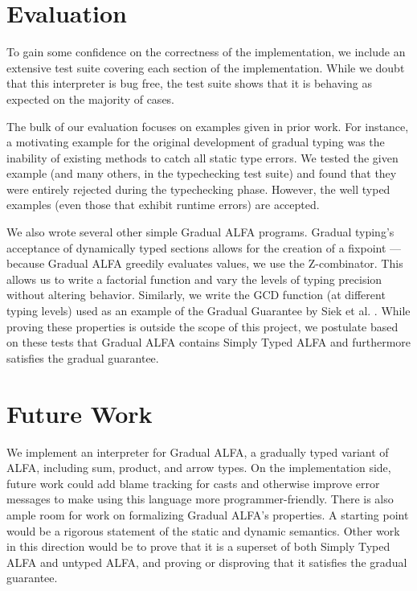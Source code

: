 \documentclass [11pt]{article}
\begin{document}

\section{Evaluation}
To gain some confidence on the correctness of the implementation, we include an extensive test suite covering each section of the implementation. While we doubt that this interpreter is bug free, the test suite shows that it is behaving as expected on the majority of cases.

The bulk of our evaluation focuses on examples given in prior work. For instance, a motivating example for the original development of gradual typing was the inability of existing methods to catch all static type errors. We tested the given example (and many others, in the typechecking test suite) and found that they were entirely rejected during the typechecking phase. However, the well typed examples (even those that exhibit runtime errors) are accepted.

We also wrote several other simple Gradual ALFA programs. Gradual typing's acceptance of dynamically typed sections allows for the creation of a fixpoint --- because Gradual ALFA greedily evaluates values, we use the Z-combinator. This allows us to write a factorial function and vary the levels of typing precision without altering behavior. Similarly, we write the GCD function (at different typing levels) used as an example of the Gradual Guarantee by Siek et al. \cite{siek2015refined}. While proving these properties is outside the scope of this project, we postulate based on these tests that Gradual ALFA contains Simply Typed ALFA and furthermore satisfies the gradual guarantee.

\section{Future Work}
We implement an interpreter for Gradual ALFA, a gradually typed variant of ALFA, including sum, product, and arrow types. On the implementation side,  future work could add blame tracking for casts and otherwise improve error messages to make using this language more programmer-friendly. There is also ample room for work on formalizing Gradual ALFA's properties. A starting point would be a rigorous statement of the static and dynamic semantics. Other work in this direction would be to prove that it is a superset of both Simply Typed ALFA and untyped ALFA, and proving or disproving that it satisfies the gradual guarantee.
\end{document}
